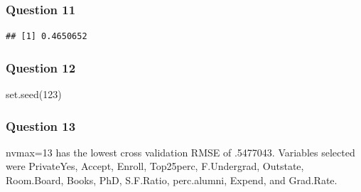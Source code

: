 \documentclass[]{article}
\newenvironment{Shaded}{\begin{snugshade}}{\end{snugshade}}
\newcommand{\DecValTok}[1]{\textcolor[rgb]{0.00,0.00,0.81}{#1}}
\newcommand{\FunctionTok}[1]{\textcolor[rgb]{0.00,0.00,0.00}{#1}}
\newcommand{\NormalTok}[1]{#1}
\newcommand{\OtherTok}[1]{\textcolor[rgb]{0.56,0.35,0.01}{#1}}
\newcommand{\SpecialCharTok}[1]{\textcolor[rgb]{0.00,0.00,0.00}{#1}}
\begin{document}
\hypertarget{question-11}{%
\subsubsection{Question 11}\label{question-11}}

\begin{Shaded}
\end{Shaded}

\begin{verbatim}
## [1] 0.4650652
\end{verbatim}

\hypertarget{question-12}{%
\subsubsection{Question 12}\label{question-12}}

\begin{Shaded}
\begin{Highlighting}[]
\FunctionTok{set.seed}\NormalTok{(}\DecValTok{123}\NormalTok{)}
\end{Highlighting}
\end{Shaded}

\hypertarget{question-13}{%
\subsubsection{Question 13}\label{question-13}}

nvmax=13 has the lowest cross validation RMSE of .5477043. Variables
selected were PrivateYes, Accept, Enroll, Top25perc, F.Undergrad,
Outstate, Room.Board, Books, PhD, S.F.Ratio, perc.alumni, Expend, and
Grad.Rate.
\end{document}
